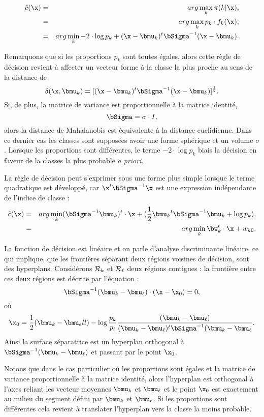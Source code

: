 \begin{eqnarray*}
\hat{c}(\x) & = & arg \max_k \pi (k | \x ),\\
            & = & arg \max_k p_k \cdot f_k(\x),\\
            & = & arg \min_k -2 \cdot \log p_k  + (\x - \bmu_k)^t \bSigma^{-1} (\x - \bmu_k).
\end{eqnarray*}

Remarquons que si les proportions $p_k$ sont toutes \'egales, alors cette r\`egle de
d\'ecision revient \`a affecter un vecteur forme \`a la classe la plus proche au
sens de la distance de 
$$
\delta(\x,\bmu_k)=[(\x - \bmu_k)^t \bSigma^{-1} (\x - \bmu_k)]^{\frac{1}{2}}.
$$ 
Si, de plus, la matrice de variance est proportionnelle \`a la matrice identit\'e,
$$
\bSigma=\sigma \cdot I,
$$
alors la distance de Mahalanobis est \'equivalente \`a la distance euclidienne. Dans ce dernier
cas les classes sont suppos\'ees avoir une forme sph\'erique et un volume $\sigma$.
Lorsque les proportions sont diff\'erentes, le terme $-2 \cdot \log p_k$ biais la 
d\'ecision en faveur de la classes la plus probable {\em a priori}.


La r\`egle de d\'ecision peut s'exprimer sous une forme plus simple lorsque le terme
quadratique est d\'evelopp\'e, car $\x^t \bSigma^{-1} \x$ est une expression ind\'ependante
de l'indice de classe : 
\begin{eqnarray*}
\hat{c}(\x) & = & arg \min_k (\bSigma^{-1} \bmu_k)^t \cdot \x + (\frac{1}{2}{\bmu_k}^t\bSigma^{-1} \bmu_k + \log p_k),\\
            & = & arg \min_k \bw_k^t \cdot \x + w_{k0}.
\end{eqnarray*}

La fonction de d\'ecision est lin\'eaire et on parle d'analyse discriminante lin\'eaire, ce qui
implique, que les fronti\`eres s\'eparant deux  r\'egions voisines de d\'ecision, sont des hyperplans.
Consid\'erons  ${\cal R}_k$ et ${\cal R}_\ell$ deux r\'egions contigues :  la fronti\`ere entre ces
deux r\'egions est d\'ecrite par l'\'equation : 
$$
\bSigma^{-1} (\bmu_k-\bmu_\ell)\cdot (\x - \x_0)=0,
$$ 
o\`u 
$$
\x_0=\frac{1}{2}(\bmu_k - \bmu_ell) - \log \frac{p_k}{p_\ell} \frac{(\bmu_k-\bmu_\ell)}{(\bmu_k-\bmu_\ell)^t\bSigma^{-1} (\bmu_k-\bmu_\ell }.
$$
Ainsi la surface s\'eparatrice est un hyperplan orthogonal \`a $\bSigma^{-1} (\bmu_k-\bmu_\ell)$ et
passant par le point $\x_0$.

Notons que dans le cas particulier o\`u les proportions 
sont \'egales et la matrice de variance proportionnelle \`a la matrice identit\'e, alors
l'hyperplan est orthogonal \`a l'axes reliant les vecteur moyennes $\bmu_k$ et $\bmu_\ell$
et le point $\x_0$ est exactement au milieu du segment d\'efini par $\bmu_k$ et $\bmu_\ell$.
Si les proportions sont diff\'erentes cela revient \`a translater l'hyperplan vers la
classe la moins probable.

